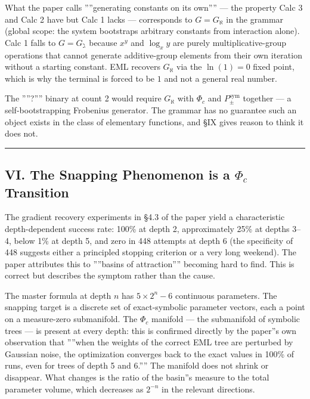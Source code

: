 \documentclass[12pt,a4paper]{article}
\newcommand{\pilcrow}{\S}
\begin{document}
What the paper calls ''''generating constants on its own'''' --- the property Calc 3 and
Calc 2 have but Calc 1 lacks --- corresponds to $G = G_{\aleph}$ in the grammar
(global scope: the system bootstraps arbitrary constants from interaction alone).
Calc 1 falls to $G = G_{\gimel}$ because $x^y$ and $\log_x y$ are purely
multiplicative-group operations that cannot generate additive-group elements from
their own iteration without a starting constant. EML recovers $G_{\aleph}$ via the
$\ln(1) = 0$ fixed point, which is why the terminal is forced to be $1$ and not a
general real number.

The ''''?'''' binary at count 2 would require $G_{\aleph}$ with $\Phi_c$ and
$P_{\pm}^{\text{sym}}$ together --- a self-bootstrapping Frobenius generator. The
grammar has no guarantee such an object exists in the class of elementary
functions, and \pilcrow{}IX gives reason to think it does not.

\begin{center}
\rule{0.5\textwidth}{0.4pt}
\end{center}

\subsection{VI. The Snapping Phenomenon is a $\Phi_c$ Transition}

The gradient recovery experiments in \pilcrow{}4.3 of the paper yield a characteristic
depth-dependent success rate: 100\% at depth 2, approximately 25\% at depths 3--4,
below 1\% at depth 5, and zero in 448 attempts at depth 6 (the specificity of
448 suggests either a principled stopping criterion or a very long weekend).
The paper attributes this to ''''basins of attraction'''' becoming hard to find. This is correct but
describes the symptom rather than the cause.

The master formula at depth $n$ has $5 \times 2^n - 6$ continuous parameters.
The snapping target is a discrete set of exact-symbolic parameter vectors, each
a point on a measure-zero submanifold. The $\Phi_c$ manifold --- the submanifold
of symbolic trees --- is present at every depth: this is confirmed directly by the
paper''s own observation that ''''when the weights of the correct EML tree are
perturbed by Gaussian noise, the optimization converges back to the exact values
in 100\% of runs, even for trees of depth 5 and 6.'''' The manifold does not shrink
or disappear. What changes is the ratio of the basin''s measure to the total
parameter volume, which decreases as $2^{-n}$ in the relevant directions.
\end{document}
